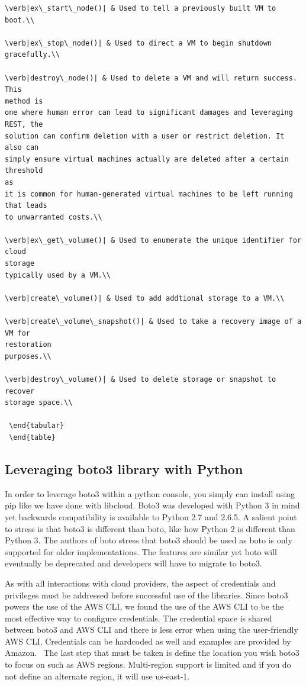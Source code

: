 \begin{verbatim}
\verb|ex\_start\_node()| & Used to tell a previously built VM to boot.\\

\verb|ex\_stop\_node()| & Used to direct a VM to begin shutdown gracefully.\\

\verb|destroy\_node()| & Used to delete a VM and will return success. This
method is
one where human error can lead to significant damages and leveraging REST, the
solution can confirm deletion with a user or restrict deletion. It also can
simply ensure virtual machines actually are deleted after a certain threshold
as
it is common for human-generated virtual machines to be left running that leads
to unwarranted costs.\\

\verb|ex\_get\_volume()| & Used to enumerate the unique identifier for cloud
storage
typically used by a VM.\\

\verb|create\_volume()| & Used to add addtional storage to a VM.\\

\verb|create\_volume\_snapshot()| & Used to take a recovery image of a VM for
restoration
purposes.\\

\verb|destroy\_volume()| & Used to delete storage or snapshot to recover
storage space.\\

 \end{tabular}
 \end{table}
\end{verbatim}

\subsection{Leveraging boto3 library with Python}

In order to leverage boto3 within a python console, you simply can install
using
pip like we have done with libcloud. Boto3 was developed with Python 3 in mind
yet backwards compatibility is available to Python 2.7 and 2.6.5. A salient
point to stress is that boto3 is different than boto, like how Python 2 is
different than Python 3. The authors of boto stress that boto3 should be used
as
boto is only supported for older implementations. The features are similar yet
boto will eventually be deprecated and developers will have to migrate to
boto3.~\cite{hid-sp18-518-AWS-boto3}

As with all interactions with cloud providers, the aspect of credentials and
privileges must be addressed before successful use of the libraries. Since
boto3
powers the use of the AWS CLI, we found the use of the AWS CLI to be the most
effective way to configure credentials. The credential space is shared between
boto3 and AWS CLI and there is less error when using the user-friendly AWS CLI.
Credentials can be hardcoded as well and examples are provided by
Amazon.~\cite{hid-sp18-518-Boto3} The last step that must be taken is define
the
location you wish boto3 to focus on such as AWS regions. Multi-region support
is
limited and if you do not define an alternate region, it will use us-east-1.

